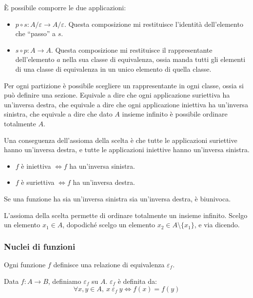 \`E possibile comporre le due applicazioni:
\begin{itemize}
  \item $p \circ s: A / \varepsilon \to A / \varepsilon$. Questa composizione mi restituisce l'identit\`a dell'elemento che ``passo'' a $s$.
  \item $s \circ p : A \to A$. Questa composizione mi restituisce il rappresentante dell'elemento $a$ nella sua classe di equivalenza, ossia manda tutti gli elementi di una classe di equivalenza in un unico elemento di quella classe.
\end{itemize}

\begin{theorem}
Per ogni partizione \`e possibile scegliere un rappresentante in ogni classe, ossia si pu\`o definire una sezione. Equivale a dire che ogni applicazione suriettiva ha un'inversa destra, che equivale a dire che ogni applicazione iniettiva ha un'inversa sinistra, che equivale a dire che dato $A$ insieme infinito \`e possibile ordinare totalmente $A$.
\end{theorem}

Una conseguenza dell'assioma della scelta \`e che tutte le applicazioni suriettive hanno un'inversa destra, e tutte le applicazioni iniettive hanno un'inversa sinistra.
\begin{itemize}
  \item $f$ \`e iniettiva $\iff f$ ha un'inversa sinistra.
  \item $f$ \`e suriettiva $\iff f$ ha un'inversa destra.
\end{itemize}
Se una funzione ha sia un'inversa sinistra sia un'inversa destra, \`e biunivoca.

L'assioma della scelta permette di ordinare totalmente un insieme infinito. Scelgo un elemento $x_1 \in A$, dopodich\'e scelgo un elemento $x_2 \in A \setminus \{x_1\}$, e via dicendo.

\subsubsection{Nuclei di funzioni}

Ogni funzione $f$ definisce una relazione di equivalenza $\varepsilon_f$. 

\begin{defn}
Data $f : A \to B$, definiamo $\varepsilon_f$ su $A$. $\varepsilon_f$ \`e definita da:
\[
\forall x, y \in A , \ x \ \varepsilon_f \ y \iff f(x) = f(y)
\]
\end{defn}

